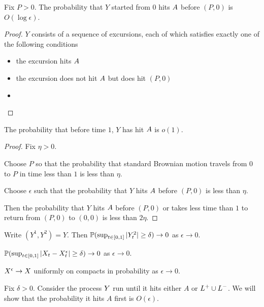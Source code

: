 {\begin{lemma}
  Fix $P > 0$.  The probability that $Y$ started from $0$ hits
  $\boundarylines$ before $(P,0)$ is $O(\log\epsilon)$.
\end{lemma}

\begin{proof}
  $Y$ consists of a sequence of excursions, each of which satisfies
  exactly one of the following conditions
  \begin{itemize}
  \item the excursion hits $\boundarylines$
  \item the excursion does not hit $\boundarylines$ but does hit
    $(P,0)$
  \item 
  \end{itemize}
\end{proof}

\begin{lemma}
  The probability that before time $1$, $Y$ has hit $\boundarylines$
  is $o(1)$.
\end{lemma}

\begin{proof}
  Fix $\eta > 0$.

  Choose $P$ so that the probability that standard Brownian motion
  travels from $0$ to $P$ in time less than $1$ is less than
  $\eta$.

  Choose $\epsilon$ such that the probability that $Y$ hits
  $\boundarylines$ before $(P,0)$ is less than $\eta$.

  Then the probability that $Y$ hits $\boundarylines$ before $(P,0)$
  or takes less time than $1$ to return from $(P,0)$ to $(0,0)$ is
  less than $2\eta$.
\end{proof}

\begin{lemma}
  Write $(Y^1, Y^2) = Y$.  Then $\P(\sup_{t \in [0,1]} |Y^2_t| \ge
  \delta) \to 0$ as $\epsilon \to 0$.
\end{lemma}

\begin{lemma}
  $\P(\sup_{t \in [0,1]} |\sampled_t - \resamplede_t | \ge \delta) \to
  0$ as $\epsilon \to 0$.
\end{lemma}

\begin{lemma}
  $\resamplede \to \sampled$ uniformly on compacts in probability as
  $\epsilon \to 0$.
\end{lemma}

Fix $\delta > 0$.  Consider the process $\rotproc$ run until it hits
either $A$ or $\L$.  We will show that the probability it
hits $A$ first is $O(\epsilon)$.

}
